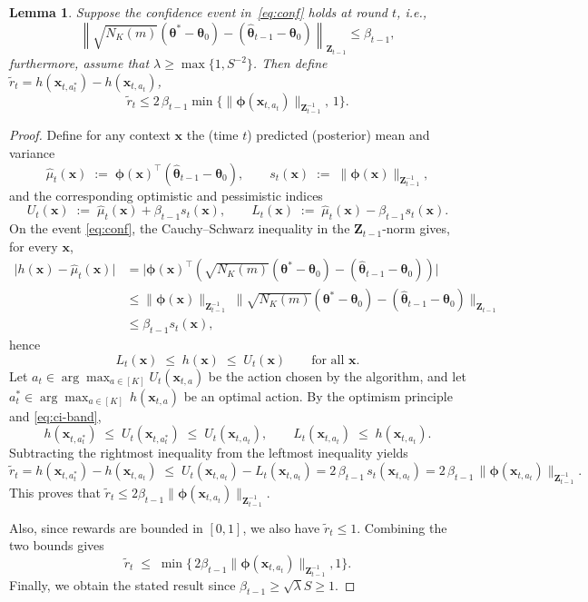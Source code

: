 \documentclass[10pt,a4paper]{amsart}
\newtheorem{lemma}{Lemma}
\newcommand{\Zbf}{\mathbf{Z}}
\newcommand{\norm}[1]{\left\lVert#1\right\rVert}
\newcommand{\phibf}{\bm{\phi}}
\newcommand{\thetabf}{\bm{\theta}}
\newcommand{\xbf}{\mathbf{x}}
\begin{document}
\begin{lemma}\label{lem:inst}
Suppose the
confidence event in~\eqref{eq:conf} holds at round $t$, i.e.,
\[
\norm{\sqrt{N_K(m)}({\thetabf}^* - {\thetabf}_0)-(\hat{\thetabf}_{t-1}-\thetabf_0)}_{\Zbf_{t-1}}  \leq \beta_{t-1},
\]
furthermore, assume that $\lambda \geq \max\{1,S^{-2}\}$. Then define $\widetilde{r}_t=h(\xbf_{t,a_t^*})-h(\xbf_{t,a_t})$,
\[
\widetilde{r}_t \le 2\,\beta_{t-1}\min\bigl\{\|\phibf(\xbf_{t,a_t})\|_{\Zbf_{t-1}^{-1}},\,1\bigr\}.
\]
\end{lemma}

\begin{proof}
Define for any context $\xbf$ the (time $t$) predicted (posterior) mean and variance
\[
\hat{\mu}_{t}(\xbf)\;:=\;\phibf(\xbf)^\top (\hat{\bm{\theta}}_{t-1} - \thetabf_0),
\qquad
s_{t}(\xbf)\;:=\;\|\phibf(\xbf)\|_{\Zbf_{t-1}^{-1}},
\]
and the corresponding optimistic and pessimistic indices
\[
U_{t}(\xbf)\;:=\;\hat{\mu}_{t}(\xbf)+\beta_{t-1}s_{t}(\xbf),
\qquad
L_{t}(\xbf)\;:=\;\hat{\mu}_{t}(\xbf)-\beta_{t-1}s_{t}(\xbf).
\]
On the event \eqref{eq:conf}, the Cauchy–Schwarz inequality in the
$\Zbf_{t-1}$-norm gives, for every $\xbf$,
\begin{align*}
\bigl| h(\xbf)-\hat{\mu}_{t}(\xbf)\bigr|
&=\bigl|\phibf(\xbf)^\top(\sqrt{N_K(m)}(\bm{\theta}^*- \thetabf_0)-(\hat{\bm{\theta}}_{t-1}-\thetabf_0))\bigr| \\
&\le \|\phibf(\xbf)\|_{\Zbf_{t-1}^{-1}}\;\|\sqrt{N_K(m)}(\bm{\theta}^*- \thetabf_0)-(\hat{\bm{\theta}}_{t-1}-\thetabf_0)\|_{\Zbf_{t-1}} \\
&\le \beta_{t-1}s_{t}(\xbf),
\end{align*}
hence
\begin{equation}\label{eq:ci-band}
L_{t}(\xbf)\;\le\; h(\xbf)\;\le\; U_{t}(\xbf)\qquad \text{for all $\xbf$.}
\end{equation}
Let $a_t\in\arg\max_{a\in[K]}U_{t}(\xbf_{t,a})$ be the action chosen by the algorithm, and let
$a_t^*\in\arg\max_{a\in[K]}\,h(\xbf_{t,a})$ be an optimal action. By the optimism principle and \eqref{eq:ci-band},
\[
h(\xbf_{t,a_t^*})
\;\le\; U_{t}(\xbf_{t,a_t^*})
\;\le\; U_{t}(\xbf_{t,a_t}),
\qquad
L_{t}(\xbf_{t,a_t})
\;\le\; h(\xbf_{t,a_t}).
\]
Subtracting the rightmost inequality from the leftmost inequality yields
\[
\widetilde{r}_t
= h(\xbf_{t,a_t^*})-h(\xbf_{t,a_t})
\;\le\; U_{t}(\xbf_{t,a_t}) - L_{t}(\xbf_{t,a_t})
= 2\,\beta_{t-1}\,s_{t}(\xbf_{t,a_t})
= 2\,\beta_{t-1}\,\|\phibf(\xbf_{t,a_t})\|_{\Zbf_{t-1}^{-1}}.
\]
This proves  that $\widetilde{r}_t\le 2\beta_{t-1}\|\phibf(\xbf_{t,a_t})\|_{\Zbf_{t-1}^{-1}}$.

Also, since rewards are bounded in $[0,1]$, we also have $\widetilde{r}_t\le 1$. Combining the two bounds gives
\[
\widetilde{r}_t \;\le\; \min\bigl\{\,2\beta_{t-1}\|\phibf(\xbf_{t,a_t})\|_{\Zbf_{t-1}^{-1}},1\bigr\}.
\]
Finally, we obtain the stated result since $\beta_{t-1} \geq \sqrt{\lambda}S\geq 1$.
\end{proof}
\end{document}
